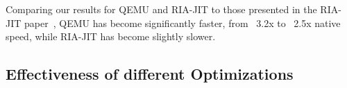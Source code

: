 \documentclass[course=eragp]{aspdoc}
\begin{document}
\par

Comparing our results for QEMU and RIA-JIT to those presented in the RIA-JIT paper~\cite{ria_jit_paper}, QEMU has become significantly faster, %
from ~3.2x to ~2.5x native speed, while RIA-JIT has become slightly slower.


\subsection{Effectiveness of different Optimizations}
\end{document}
